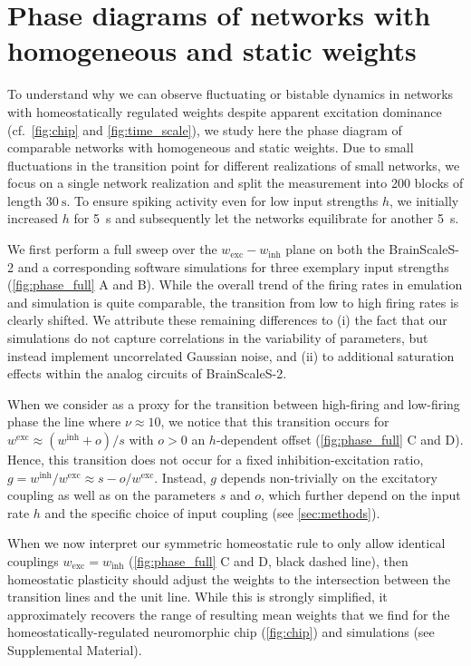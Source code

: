 \section{Phase diagrams of networks with homogeneous and static weights \label{sec:phase_diagrams}}

To understand why we can observe fluctuating or bistable dynamics in networks with homeostatically regulated weights despite apparent excitation dominance (cf.\ \cref{fig:chip} and \cref{fig:time_scale}), we study here the phase diagram of comparable networks with homogeneous and static weights.
Due to small fluctuations in the transition point for different realizations of small networks, we focus on a single network realization and split the measurement into \num{200} blocks of length $\SI{30}{\second}$.
To ensure spiking activity even for low input strengths $h$, we initially increased $h$ for \SI{5}{\second} and subsequently let the networks equilibrate for another \SI{5}{\second}.

We first perform a full sweep over the $w_\mathrm{exc}-w_\mathrm{inh}$ plane on both the BrainScaleS-2 and a corresponding software simulations for three exemplary input strengths (\cref{fig:phase_full} A and B).
While the overall trend of the firing rates in emulation and simulation is quite comparable, the transition from low to high firing rates is clearly shifted.
We attribute these remaining differences to (i) the fact that our simulations do not capture correlations in the variability of parameters, but instead implement uncorrelated Gaussian noise, and (ii) to additional saturation effects within the analog circuits of BrainScaleS-2.

When we consider as a proxy for the transition between high-firing and low-firing phase the line where $\nu\approx 10$, we notice that this transition occurs for $w^\mathrm{exc} \approx \left(w^\mathrm{inh} + o\right)/s$ with $o>0$ an $h$-dependent offset (\cref{fig:phase_full} C and D).
Hence, this transition does not occur for a fixed inhibition-excitation ratio, $g=w^\mathrm{inh}/w^\mathrm{exc} \approx s - o/w^\mathrm{exc}$.
Instead, $g$ depends non-trivially on the excitatory coupling as well as on the parameters $s$ and $o$, which further depend on the input rate $h$ and the specific choice of input coupling (see \cref{sec:methods}).

When we now interpret our symmetric homeostatic rule to only allow identical couplings $w_\mathrm{exc}=w_\mathrm{inh}$ (\cref{fig:phase_full} C and D, black dashed line), then homeostatic plasticity should adjust the weights to the intersection between the transition lines and the unit line.
While this is strongly simplified, it approximately recovers the range of resulting mean weights that we find for the homeostatically-regulated neuromorphic chip (\cref{fig:chip}) and simulations (see Supplemental Material).

